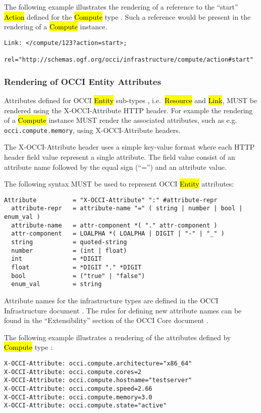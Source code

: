 \documentclass[10pt,a4paper]{article}
\begin{document}
The following example illustrates the rendering of a reference to the
``start'' \hl{Action} defined for the \hl{Compute} type
\cite{occi:infrastructure}. Such a reference would be present in the
rendering of a \hl{Compute} instance.

\begin{verbatim}
Link: </compute/123?action=start>;
    rel="http://schemas.ogf.org/occi/infrastructure/compute/action#start"
\end{verbatim}

\subsubsection{Rendering of OCCI Entity Attributes}
Attributes defined for OCCI \hl{Entity} sub-types \cite{occi:core},
i.e.~\hl{Resource} and \hl{Link}, MUST be rendered using the
X-OCCI-Attribute HTTP header. For example the rendering of a
\hl{Compute} instance MUST render the associated attributes, such as
e.g. \texttt{occi.compute.memory}, using X-OCCI-Attribute headers.

The X-OCCI-Attribute header uses a simple key-value format where each
HTTP header field value represent a single attribute. The field value
consist of an attribute name followed by the equal sign (``='') and an
attribute value.

The following syntax MUST be used to represent OCCI \hl{Entity}
attributes:

\begin{verbatim}
Attribute          = "X-OCCI-Attribute" ":" #attribute-repr
  attribute-repr   = attribute-name "=" ( string | number | bool | enum_val )
  attribute-name   = attr-component *( "." attr-component )
  attr-component   = LOALPHA *( LOALPHA | DIGIT | "-" | "_" )	
  string           = quoted-string
  number           = (int | float)
  int              = *DIGIT
  float            = *DIGIT "." *DIGIT
  bool             = ("true" | "false")
  enum_val         = string
\end{verbatim}

Attribute names for the infrastructure types are defined in the OCCI
Infrastructure document \cite{occi:infrastructure}.  The rules for
defining new attribute names can be found in the ``Extensibility''
section of the OCCI Core document \cite{occi:core}.

The following example illustrates a rendering of the attributes
defined by \hl{Compute} type \cite{occi:infrastructure}:

\begin{verbatim}
X-OCCI-Attribute: occi.compute.architecture="x86_64"
X-OCCI-Attribute: occi.compute.cores=2
X-OCCI-Attribute: occi.compute.hostname="testserver"
X-OCCI-Attribute: occi.compute.speed=2.66
X-OCCI-Attribute: occi.compute.memory=3.0
X-OCCI-Attribute: occi.compute.state="active"
\end{verbatim}
\end{document}
